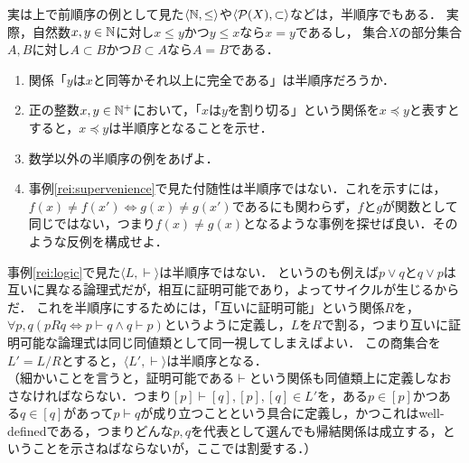 \documentclass[dvipdfmx,11pt,a4paper]{jsarticle}
\begin{document}
実は上で前順序の例として見た$\langle \mathbb{N}, \leq \rangle$や$\langle \mathcal{P}(X), \subset \rangle$などは，半順序でもある．
実際，自然数$x, y \in \mathbb{N}$に対し$x \leq y$かつ$y \leq x$なら$x=y$であるし，
集合$X$の部分集合$A, B$に対し$A \subset B$かつ$B \subset A$なら$A=B$である．

\begin{renshu}{}{}
\begin{enumerate}
 \item 関係「$y$は$x$と同等かそれ以上に完全である」は半順序だろうか．
 \item 正の整数$x, y \in \mathbb{N}^+$において，「$x$は$y$を割り切る」という関係を$x \preceq y$と表すとすると，$x \preceq y$は半順序となることを示せ．
 \item 数学以外の半順序の例をあげよ．
 \item 事例\ref{rei:supervenience}で見た付随性は半順序ではない．これを示すには，$f(x) \neq f(x') \iff g(x) \neq g(x')$であるにも関わらず，$f$と$g$が関数として同じではない，つまり$f(x) \neq g(x)$となるような事例を探せば良い．そのような反例を構成せよ．
\end{enumerate}
\end{renshu}

事例\ref{rei:logic}で見た$\langle L, \vdash \rangle$は半順序ではない．
というのも例えば$p \vee q$と$q \vee p$は互いに異なる論理式だが，相互に証明可能であり，よってサイクルが生じるからだ．
これを半順序にするためには，「互いに証明可能」という関係$R$を，$\forall p, q (pRq \iff p \vdash q \wedge q \vdash p)$というように定義し，$L$を$R$で割る，つまり互いに証明可能な論理式は同じ同値類として同一視してしまえばよい．
この商集合を$L' = L/R$とすると，$\langle L', \vdash \rangle$は半順序となる．\\
（細かいことを言うと，証明可能である$\vdash$という関係も同値類上に定義しなおさなければならない．つまり$[p]\vdash[q], [p], [q] \in L'$を，ある$p \in [p]$かつある$q \in [q]$があって$p \vdash q$が成り立つことという具合に定義し，かつこれはwell-definedである，つまりどんな$p, q$を代表として選んでも帰結関係は成立する，ということを示さねばならないが，ここでは割愛する．）
\end{document}
